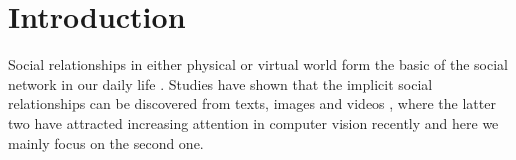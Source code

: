 \documentclass{article}
\begin{document}
\section{Introduction}
Social relationships in either physical or virtual world form the basic of the social network in our daily life \cite{DBLP:conf/wacv/BarrCBF14}. Studies have shown that the implicit social relationships can be discovered from texts, images \cite{DBLP:conf/iccv/LiWZK17,DBLP:conf/ijcai/WangCRYCL18,DBLP:conf/eccv/WangGLF10,DBLP:conf/iccv/ZhangLLT15} and videos \cite{DBLP:conf/eccv/DingY10,DBLP:conf/cvpr/RamanathanY013,DBLP:journals/ivc/VinciarelliPB09}, where the latter two have attracted increasing attention in computer vision recently and here we mainly focus on the second one.
\end{document}
